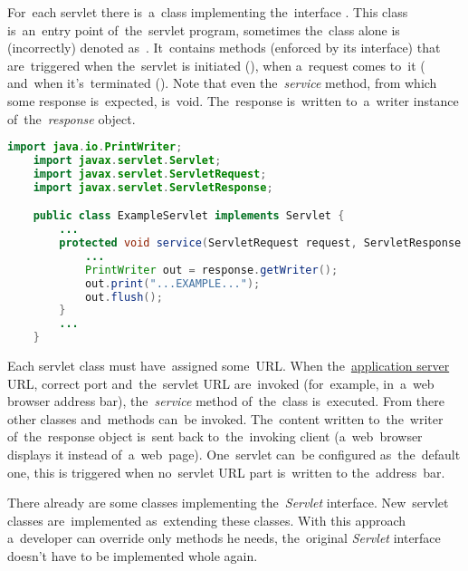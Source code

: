 For~each servlet there is~a~class implementing the~interface .
This class is~an~entry point of~the~servlet program, sometimes the~class alone is (incorrectly) denoted as~.
It~contains methods (enforced by its interface) that are~triggered when the~servlet is initiated (), when a~request comes to~it ( and~when it's~terminated ().
Note that even the~\textit{service} method, from which some response is~expected, is~void.
The~response is~written to~a~writer instance of~the~\textit{response} object.

\enlargethispage{10mm}
\example
\begin{lstlisting}[language=Java]
    import java.io.PrintWriter;
    import javax.servlet.Servlet;
    import javax.servlet.ServletRequest;
    import javax.servlet.ServletResponse;

    public class ExampleServlet implements Servlet {
        ...
        protected void service(ServletRequest request, ServletResponse response) {
            ...
            PrintWriter out = response.getWriter();
            out.print("...EXAMPLE...");
            out.flush();
        }
        ...
    }
\end{lstlisting}

Each servlet class must have~assigned some~URL.
When the~\hyperref[applicationserver]{application server} URL, correct port and~the~servlet URL are~invoked (for~example, in~a~web browser address bar), the~\textit{service} method of~the~class is~executed.
From there other classes and~methods can~be invoked.
The~content written to~the~writer of~the~response object is~sent back to~the~invoking client (a~web~browser displays it instead of~a~web~page).
One~servlet can~be configured as~the~default one, this is triggered when no~servlet URL part is~written to the~address~bar.

There already are some classes implementing the~\textit{Servlet} interface.
New~servlet classes are~implemented as~extending these classes.
With this approach a~developer can override only methods he needs, the~original \textit{Servlet} interface doesn't have to be implemented whole again.

